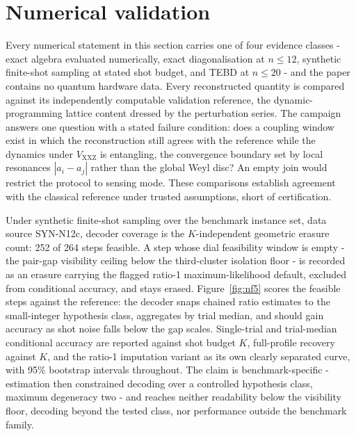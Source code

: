\section{Numerical validation}\label{sec:N6}

Every numerical statement in this section carries one of four evidence classes - exact algebra evaluated numerically, exact diagonalisation at $n \le 12$, synthetic finite-shot sampling at stated shot budget, and TEBD at $n \le 20$ - and the paper contains no quantum hardware data. Every reconstructed quantity is compared against its independently computable validation reference, the dynamic-programming lattice content dressed by the perturbation series. The campaign answers one question with a stated failure condition: does a coupling window exist in which the reconstruction still agrees with the reference while the dynamics under $V_{\mathrm{XXZ}}$ is entangling, the convergence boundary set by local resonances $|a_i - a_j|$ rather than the global Weyl disc? An empty join would restrict the protocol to sensing mode. These comparisons establish agreement with the classical reference under trusted assumptions, short of certification.

Under synthetic finite-shot sampling over the benchmark instance set, data source SYN-N12c, decoder coverage is the $K$-independent geometric erasure count: 252 of 264 steps feasible. A step whose dial feasibility window is empty - the pair-gap visibility ceiling below the third-cluster isolation floor - is recorded as an erasure carrying the flagged ratio-1 maximum-likelihood default, excluded from conditional accuracy, and stays erased. Figure~\ref{fig:nf5} scores the feasible steps against the reference: the decoder snaps chained ratio estimates to the small-integer hypothesis class, aggregates by trial median, and should gain accuracy as shot noise falls below the gap scales. Single-trial and trial-median conditional accuracy are reported against shot budget $K$, full-profile recovery against $K$, and the ratio-1 imputation variant as its own clearly separated curve, with 95\% bootstrap intervals throughout. The claim is benchmark-specific - estimation then constrained decoding over a controlled hypothesis class, maximum degeneracy two - and reaches neither readability below the visibility floor, decoding beyond the tested class, nor performance outside the benchmark family.

